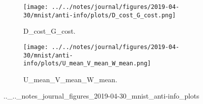 \begin{figure}[!htbp]
   \centering
\begin{subfigure}[t]{0.48\textwidth}
   \texttt{[image: ../../notes/journal/figures/2019-04-30/mnist/anti-info/plots/D\_cost\_G\_cost.png]}
   \caption{D_cost_G_cost.}
   \label{fig:.._.._notes_journal_figures_2019-04-30_mnist_anti-info_plots-a}
\end{subfigure}
\begin{subfigure}[t]{0.48\textwidth}
   \texttt{[image: ../../notes/journal/figures/2019-04-30/mnist/anti-info/plots/U\_mean\_V\_mean\_W\_mean.png]}
   \caption{U_mean_V_mean_W_mean.}
   \label{fig:.._.._notes_journal_figures_2019-04-30_mnist_anti-info_plots-b}
\end{subfigure}
   \caption{.._.._notes_journal_figures_2019-04-30_mnist_anti-info_plots}
   \label{fig:.._.._notes_journal_figures_2019-04-30_mnist_anti-info_plots}
\end{figure}